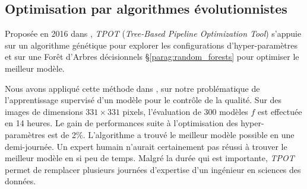 \subsection{Optimisation par algorithmes évolutionnistes} \label{subsec:evolution}
Proposée en 2016 dans \citeauthor{olson_evaluation_2016, olson_automating_2016} \cite{olson_evaluation_2016, olson_automating_2016}, \textit{TPOT} (\textit{Tree-Based Pipeline Optimization Tool}) s'appuie sur un algorithme génétique pour explorer les configurations d'hyper-paramètres et sur une Forêt d'Arbres décisionnels §\ref{parag:random_forests} pour optimiser le meilleur modèle.

Nous avons appliqué cette méthode dans  \cite{nagorny_polarimetric_2019}, sur notre problématique de l'apprentissage supervisé d'un modèle pour le contrôle de la qualité.
Sur des images de dimensions $331 \times 331$ pixels, l'évaluation de 300 modèles $f$ est effectuée en 14 heures.
Le gain de performances suite à l'optimisation des hyper-paramètres est de 2\%.
L'algorithme a trouvé le meilleur modèle possible en une demi-journée.
Un expert humain n'aurait certainement pas réussi à trouver le meilleur modèle en si peu de temps.
Malgré la durée qui est importante, \textit{TPOT} permet de remplacer plusieurs journées d'expertise d'un ingénieur en sciences des données.

%
%

